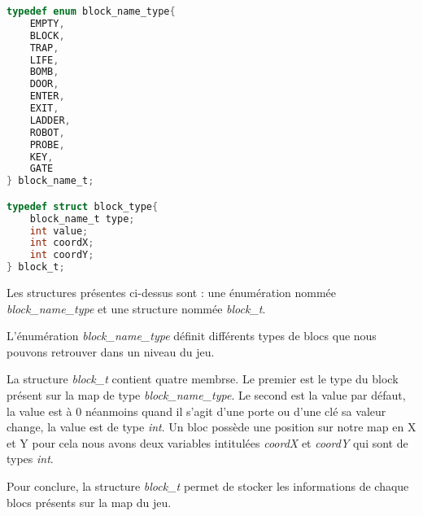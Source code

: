 

\lstset{style=mystyle}
\begin{lstlisting}[language=C, caption=Structure d'uun Block]
typedef enum block_name_type{
    EMPTY,
    BLOCK,
    TRAP,
    LIFE,
    BOMB,
    DOOR,
    ENTER,
    EXIT,
    LADDER,
    ROBOT,
    PROBE,
    KEY,
    GATE
} block_name_t;

typedef struct block_type{
    block_name_t type;
    int value;
    int coordX;
    int coordY;
} block_t;
\end{lstlisting}

Les structures présentes ci-dessus sont : une énumération nommée \textit{block\_name\_type} et une structure nommée \textit{block\_t}.

L'énumération \textit{block\_name\_type} définit différents types de blocs que nous pouvons retrouver dans un niveau du jeu.

La structure \textit{block\_t} contient quatre membrse. Le premier est le type du block présent sur la map de type \textit{block\_name\_type}. Le second est la value par défaut, la value est à 0 néanmoins quand il s'agit d'une porte ou d'une clé sa valeur change, la value est de type \textit{int}. Un bloc possède une position sur notre map en X et Y pour cela nous avons deux variables intitulées \textit{coordX} et \textit{coordY} qui sont de types \textit{int}.

Pour conclure, la structure \textit{block\_t} permet de stocker les informations de chaque blocs présents sur la map du jeu. 

\newpage